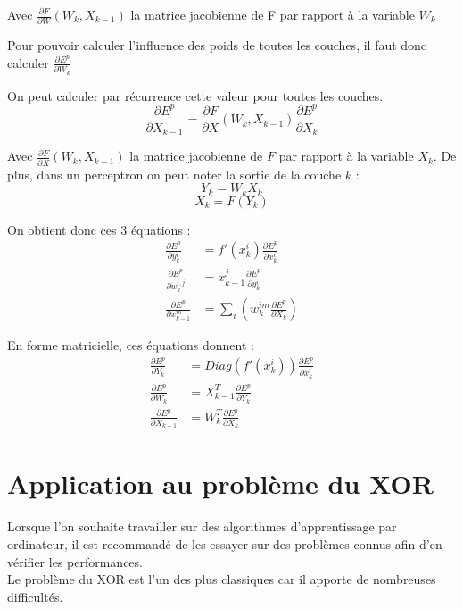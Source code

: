 Avec $\frac{\partial F}{\partial W}(W_k, X_{k-1})$ la matrice jacobienne de F par rapport à la variable $W_k$

Pour pouvoir calculer l'influence des poids de toutes les couches, il faut donc calculer $\frac{\partial E^p}{\partial W_k}$

On peut calculer par récurrence cette valeur pour toutes les couches.
\[
	\frac{\partial E^p}{\partial X _{k-1}} = \frac{\partial F}{\partial X}(W_k, X_{k-1})\frac{\partial E^p}{\partial X_k}
\]

Avec $\frac{\partial F}{\partial X }(W_k, X_{k-1})$ la matrice jacobienne de $F$ par rapport à la variable $X_k$. De plus, dans un perceptron on peut noter la sortie de la couche $k$ : 
\[
Y_k = W_k X_k \]
\[
X_k = F(Y_k)
\]

On obtient donc ces 3 équations : 
\begin{align*}
\frac{\partial E^p}{\partial y_k^i} &= f'(x_k^i)\frac{\partial E^p}{\partial x_k^i} \\
\frac{\partial E^p}{\partial w_k^{i,j}}&= x^j_{k-1} \frac{\partial E^p}{\partial y_k^i}\\
\frac{\partial E^p}{\partial x_{k-1}^m} &= \sum_i(w_k^{im}\frac{\partial E^p}{\partial X_k})
\end{align*}

En forme matricielle, ces équations donnent :
\begin{align*}
\frac{\partial E^p}{\partial Y_k} &= Diag(f'(x_k^i))\frac{\partial E^p}{\partial x_k^i} \\
\frac{\partial E^p}{\partial W_k}&= X^T_{k-1} \frac{\partial E^p}{\partial Y_k}\\
\frac{\partial E^p}{\partial X_{k-1}} &= W_k^T\frac{\partial E^p}{\partial X_k}
\end{align*}

\section{Application au problème du XOR}

\paragraph*{}
Lorsque l'on souhaite travailler sur des algorithmes d'apprentissage par ordinateur, il est recommandé de les essayer sur des problèmes connus afin d'en vérifier les performances. \\
Le problème du XOR est l'un des plus classiques car il apporte de nombreuses difficultés.

